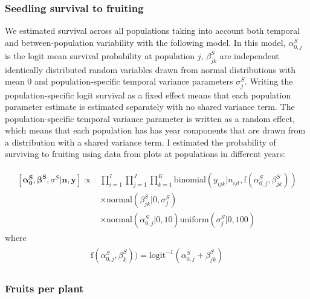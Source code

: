 \documentclass[12pt, oneside, titlepage]{article}   	%
\begin{document}
\subsubsection*{Seedling survival to fruiting}

We estimated survival across all populations taking into account both temporal and between-population variability with the following model. In this model, $\alpha^S_{0,j}$ is the logit mean survival probability at population $j$, $\beta^S_{jk}$ are independent identically distributed random variables drawn from normal distributions with mean 0 and population-specific temporal variance parameters $\sigma_j^S$. Writing the population-specific logit survival as a fixed effect means that each population parameter estimate is estimated separately with no shared variance term. The population-specific temporal variance parameter is written as a random effect, which means that each population has has year components that are drawn from a distribution with a shared variance term. I estimated the probability of surviving to fruiting using data from plots at populations in different years:

\begin{align}
  \begin{split}
 [ \bm{\alpha^S_0}, \bm{\beta^S}, \sigma^S | \bm{n}, \bm{y} ] \propto 
 & \prod_{i=1}^{I} \prod_{j=1}^{J} \prod_{k=1}^{K} \mathrm{binomial} ( y_{ijk} | n_{ijt}, \mathrm{f}(\alpha^S_{0,j} , \beta^S_{jk} ) )
     \\ & \times \mathrm{normal} ( \beta^S_{jk} | 0, \sigma_j^S) 
    \\ & \times \mathrm{normal} ( \alpha^S_{0,j} | 0, 10) \mathrm{uniform} ( \sigma_j^S | 0, 100)  
   \end{split}
\end{align}
%
where
%
\begin{align}
  \begin{split}
\mathrm{f}(\alpha^S_{0,j} , \beta^S_k ) ) = \mathrm{logit}^{-1}(\alpha^S_{0,j} + \beta^S_{jk})
  \end{split}
\end{align}
%
\subsubsection*{Fruits per plant}
\end{document}

